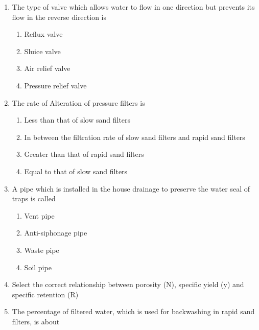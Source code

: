 \documentclass[11pt,a4paper]{article}
\begin{document}
\begin{enumerate}
\item{The type of valve which allows water to flow in one direction but prevents its flow in the reverse direction is}
\begin{enumerate}[label=\Alph*.]
\item{Reflux valve}
\item{Sluice valve}
\item{Air relief valve}
\item{Pressure relief valve}
\end{enumerate}
\item{The rate of Alteration of pressure filters is}
\begin{enumerate}[label=\Alph*.]
\item{Less than that of slow sand filters}
\item{In between the filtration rate of slow sand filters and rapid sand filters}
\item{Greater than that of rapid sand filters}
\item{Equal to that of slow sand filters}
\end{enumerate}
\item{A pipe which is installed in the house drainage to preserve the water seal of traps is called}
\begin{enumerate}[label=\Alph*.]
\item{Vent pipe}
\item{Anti-siphonage pipe}
\item{Waste pipe}
\item{Soil pipe}
\end{enumerate}
\item{Select the correct relationship between porosity (N), specific yield (y) and specific retention (R)}
\\
\item{The percentage of filtered water, which is used for backwashing in rapid sand filters, is about}
\\\begin{enumerate*}[itemjoin=\qquad, label=\Alph*.]

\end{enumerate*}
\end{enumerate}
\end{document}

